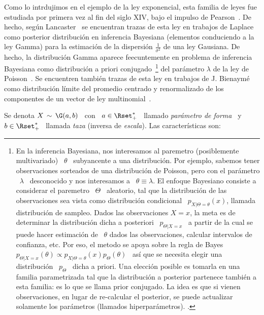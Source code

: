\label{Sssec:MP:Gamma}

Como lo intrdujimos  en el ejemplo de la ley exponencial,  esta familia de leyes
fue  estudiada  por primera  vez  al  fin del  siglo  XIV,  bajo  el impulso  de
Pearson~\cite{Pea95}.   De hecho,  seg\'un Lancaster~\cite{Lan66}  se encuentran
trazas  de esta  ley en  trabajos de  Laplace como  posterior  distribuci\'on en
inferencia Bayesiana (elementos conduciendo a la ley Gamma) para la estimaci\'on
de  la  dispersi\'on $\frac1{\sigma^2}$  de  una  ley  Gausiana.  De  hecho,  la
distribuci\'on Gamma  aparece feecuntemente en problema  de inferencia Bayesiana
como distribuci\'on a priori conjugado~\footnote{En la inferencia Bayesiana, nos
  interesamos al paremetro (posiblemente  multivariado) \ $\theta$ \ subyancente
  a una  distribuci\'on. Por ejemplo,  sabemos tener observaciones  sorteados de
  una  distribuci\'on  de  Poisson,  pero  con  el  par\'ametro  \  $\lambda$  \
  desconocido  y  nos interesamos  a  \  $\theta  \equiv \lambda$.   El  enfoque
  Bayesiano consiste a  considerar el paremetro \ $\Theta$  \ aleatorio, tal que
  la  distribuci\'on   de  las  observaciones  sea   vista  como  distribuci\'on
  condicional \  $p_{X|\Theta = \theta}(x)$, llamada  distribuci\'on de sampleo.
  Dados las  observaciones $X = x$,  la meta es de  determinar la distribuci\'on
  dicha a posteriori \  $p_{\Theta|X = x}$ \ a partir de  la cual se puede hacer
  estimaci\'on  de \ $\theta$  dados las  observaciones, calcular  intervalos de
  confianza,  etc.   Por  eso, el  metodo  se  apoya  sobre  la regla  de  Bayes
  $p_{\Theta|X=x}(\theta)  \propto  p_{X|\Theta=\theta}(x)  p_\Theta(\theta)$  \
  as\'i que se necesita elegir una distribuci\'on \ $p_\Theta$ \ dicha a priori.
  Una  elecci\'on posible es  tomarla en  una familia  parametrizada tal  que la
  distribuci\'on a  posterior partenece tambi\'en a  esta familia: es  lo que se
  llama prior  conjugado. La idea  es que si  vienen observaciones, en  lugar de
  re-calcular  el  posterior, se  puede  actualizar  solamente los  par\'ametros
  (llamados  hiperpar\'ametros).    \SZ{Ver  nota   de  pie  en   el  cap   2  a
    modificar}.\label{Foot:MP:BayesPrior} } del  par\'ametro $\lambda$ de la ley
de Poisson~\cite{Rob07}. Se encuentren tambi\'en  trazas de esta ley en trabajos
de  J.   Bienaym\'e  como  distribuci\'on  l\'imite  del   promedio  centrado  y
renormalizado de  los componentes de  un vector de  ley multinomial~\cite{Bie38,
  Lan66}.

Se  denota $X \,  \sim \,  \G(a,b)$ \  con \  $a \in  \Rset_+^*$ \  llamado {\em
par\'ametro de  forma} \ y \  $b \in \Rset_+^*$  \ llamada {\em taza}  (inversa de
{\em escala}). Las caracter\'isticas son:

